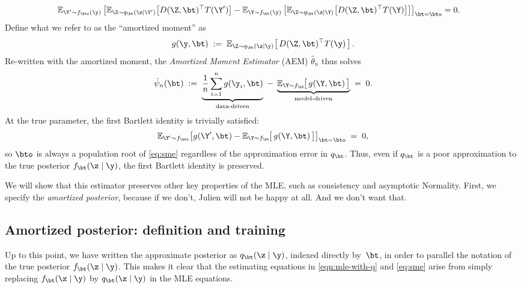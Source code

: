 \begin{align}
\mathbb{E}_{\Y'\sim f_\bto(\y)}\left[
\mathbb{E}_{\Z\sim q_\bt(\z\mid \Y')}
\!\left[ D(\Z,\bt)^\top T(\Y') \right]
-
\mathbb{E}_{\Y\sim f_\bt(\y)}\left[
\mathbb{E}_{\Z\sim q_\bt(\z\mid \Y)}
\!\left[ D(\Z,\bt)^\top T(\Y) \right]
\right]
\right]_{\bt = \bto}
&= 0.
\label{eqn:sme-estimating-equations}
\end{align}
\fi
\noindent
Define what we refer to as the ``amortized moment'' as 
\[
g(\y,\bt)
\;:=\;
\mathbb{E}_{\Z\sim q_\bt(\z\mid \y)}\!\left[\, D(\Z,\bt)^\top T(\y)\,\right].
\]
Re-written with the amortized moment, the \emph{Amortized Moment Estimator} (AEM) $\hat\theta_n$ thus solves
\begin{equation}
\label{eq:sme}
\hat\psi_n(\bt)
\;:=\;
\underbrace{\frac{1}{n}\sum_{i=1}^n g(\y_i,\bt)}_{\text{data-driven}}
\;-\;
\underbrace{\mathbb{E}_{\Y\sim f_\bt}\!\bigl[\,g(\Y,\bt)\,\bigr]}_{\text{model-driven}}
\;=\;0.
\end{equation}
At the true parameter, the first Bartlett identity is trivially satisfied:
\[
\mathbb{E}_{\Y'\sim f_{\bto}}\!\left[g(\Y',\bt) - \mathbb{E}_{\Y\sim f_\bt}\!\bigl[\,g(\Y,\bt)\,\bigr]\right]_{\bt=\bto}
\;=\;0,
\]
so $\bto$ is always a population root of \eqref{eq:sme} regardless of the approximation error in $q_\bt$. Thus, even if $q_\bt$ is a poor approximation to the true posterior $f_\bt(\z \mid \y)$, the first Bartlett identity is preserved.

We will show that this estimator preserves other key properties of the MLE, such as consistency and asymptotic Normality. First, we specify the \textit{amortized posterior}, because if we don't, Julien will not be happy at all. And we don't want that.




\subsection{Amortized posterior: definition and training}
\label{subsec:q-def}

Up to this point, we have written the approximate posterior as $q_\bt(\z \mid \y)$, 
indexed directly by~$\bt$, in order to parallel the notation of the true posterior 
$f_\bt(\z \mid \y)$. This makes it clear that the estimating equations in 
\eqref{eqn:mle-with-q} and \eqref{eq:sme} arise from simply replacing 
$f_\bt(\z \mid \y)$ by $q_\bt(\z \mid \y)$ in the MLE equations.

